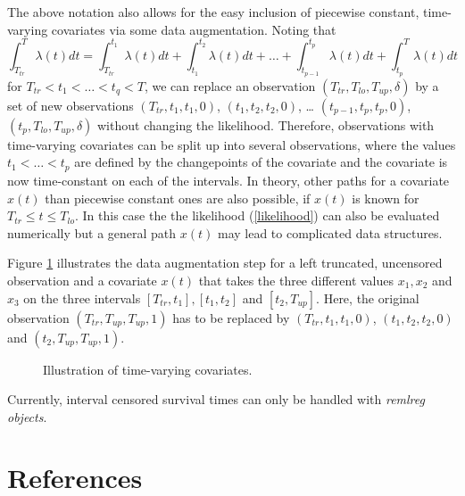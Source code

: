 \documentclass[11pt,a4paper,twoside]{bayesxarticle}
\begin{document}
The above notation also allows for the easy inclusion of piecewise
constant, time-varying covariates via some data augmentation. Noting
that
\[\int_{T_{tr}}^{T}\lambda(t)dt = \int_{T_{tr}}^{t_1}\lambda(t)dt + \int_{t_1}^{t_2}\lambda(t)dt + \ldots + \int_{t_{p-1}}^{t_p}\lambda(t)dt + \int_{t_p}^{T}\lambda(t)dt\]
for $T_{tr}<t_1<\ldots<t_q<T$, we can replace an observation
$(T_{tr},T_{lo},T_{up},\delta)$ by a set of new observations
$(T_{tr},t_1,t_1,0)$, $(t_1,t_2,t_2,0)$, \ldots
$(t_{p-1},t_p,t_p,0)$, $(t_{p},T_{lo},T_{up},\delta)$ without
changing the likelihood. Therefore, observations with time-varying
covariates can be split up into several observations, where the
values $t_1<\ldots<t_p$ are defined by the changepoints of the
covariate and the covariate is now time-constant on each of the
intervals. In theory, other paths for a covariate $x(t)$ than
piecewise constant ones are also possible, if $x(t)$ is known for
$T_{tr}\le t\le T_{lo}$. In this case the the likelihood
(\ref{likelihood}) can also be evaluated numerically but a general
path $x(t)$ may lead to complicated data structures.

Figure \ref{timevaryingcovs} illustrates the data augmentation step
for a left truncated, uncensored observation and a covariate $x(t)$
that takes the three different values $x_1,x_2$ and $x_3$ on the
three intervals $[T_{tr},t_1], [t_1,t_2]$ and $[t_2,T_{up}]$. Here,
the original observation $(T_{tr},T_{up},T_{up},1)$ has to be
replaced by $(T_{tr},t_1,t_1,0)$, $(t_1,t_2,t_2,0)$ and
$(t_2,T_{up},T_{up},1)$.
\begin{figure}[htb]
\begin{center}
{\it\caption{Illustration of time-varying
covariates.\label{timevaryingcovs}}}
\end{center}
\end{figure}

Currently, interval censored survival times can only be handled with
{\em remlreg objects}.

\section{References}
\label{bayesregref}
\end{document}
